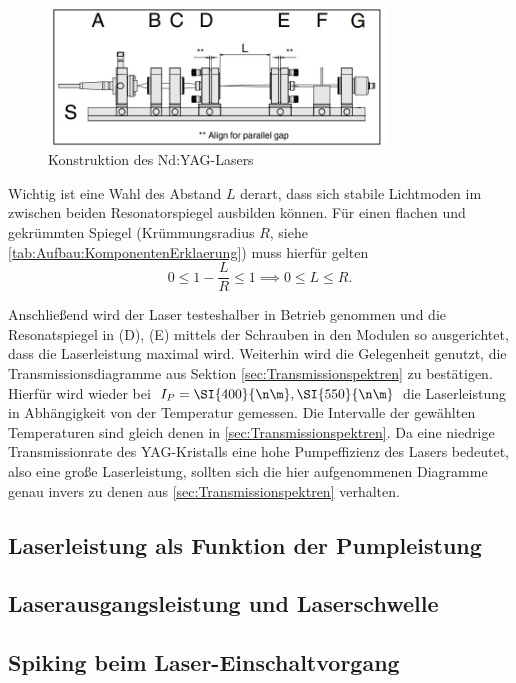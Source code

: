 \documentclass[../main.tex]{subfiles}
\begin{document}
        \begin{figure}[H]
            \centering
            \includegraphics[width=0.8\textwidth]{Bilddateien/Versuchsaufbau/Teil4.jpg}
            \caption{Konstruktion des Nd:YAG-Lasers}
            \label{fig:Aufbau:Teil4}
        \end{figure}    

        Wichtig ist eine Wahl des Abstand $L$ derart, dass sich stabile Lichtmoden im zwischen beiden Resonatorspiegel ausbilden können. Für einen flachen und gekrümmten Spiegel (Krümmungsradius $R$, siehe \ref{tab:Aufbau:KomponentenErklaerung}) muss hierfür gelten 
        \[
            0\le 1 - \frac{L}{R}\le 1\implies 0\le L\le R.    
        \]

        Anschließend wird der Laser testeshalber in Betrieb genommen und die Resonatspiegel in (D), (E) mittels der Schrauben in den Modulen so ausgerichtet, dass die Laserleistung maximal wird. Weiterhin wird die Gelegenheit genutzt, die Transmissionsdiagramme aus Sektion \ref{sec:Transmissionspektren} zu bestätigen. Hierfür wird wieder bei $I_P = \SI{400}{\n\m}, \SI{550}{\n\m}$ die Laserleistung in Abhängigkeit von der Temperatur gemessen. Die Intervalle der gewählten Temperaturen sind gleich denen in \ref{sec:Transmissionspektren}. Da eine niedrige Transmissionrate des YAG-Kristalls eine hohe Pumpeffizienz des Lasers bedeutet, also eine große Laserleistung, sollten sich die hier aufgenommenen Diagramme genau invers zu denen aus \ref{sec:Transmissionspektren} verhalten.

    \subsection{Laserleistung als Funktion der Pumpleistung}
        

    \subsection{Laserausgangsleistung und Laserschwelle}

    \subsection{Spiking beim Laser-Einschaltvorgang}
\end{document}
